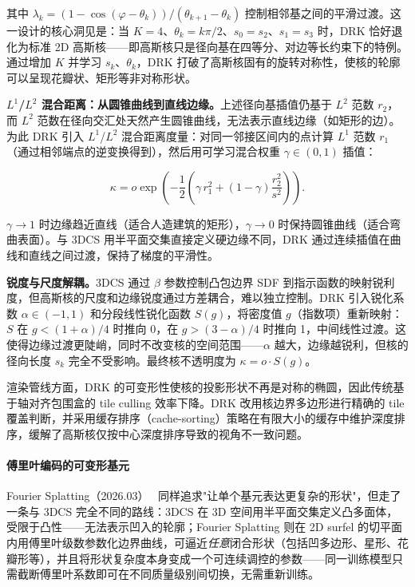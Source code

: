 其中 $\lambda_k = (1 - \cos(\varphi - \theta_k)) / (\theta_{k+1} - \theta_k)$ 控制相邻基之间的平滑过渡。这一设计的核心洞见是：当 $K=4$、$\theta_k = k\pi/2$、$s_0=s_2$、$s_1=s_3$ 时，DRK 恰好退化为标准 2D 高斯核——即高斯核只是径向基在四等分、对边等长约束下的特例。通过增加 $K$ 并学习 $s_k$、$\theta_k$，DRK 打破了高斯核固有的旋转对称性，使核的轮廓可以呈现花瓣状、矩形等非对称形状。

\textbf{$L^1$/$L^2$ 混合距离：从圆锥曲线到直线边缘。}上述径向基插值仍基于 $L^2$ 范数 $r_2$，而 $L^2$ 范数在径向交汇处天然产生圆锥曲线，无法表示直线边缘（如矩形的边）。为此 DRK 引入 $L^1$/$L^2$ 混合距离度量：对同一邻接区间内的点计算 $L^1$ 范数 $r_1$（通过相邻端点的逆变换得到），然后用可学习混合权重 $\gamma \in (0,1)$ 插值：

\begin{equation}
    \kappa = o \exp\!\left(-\frac{1}{2}\left(\gamma \, r_1^2 + (1-\gamma) \frac{r_2^2}{s^2}\right)\right).
\end{equation}

$\gamma \to 1$ 时边缘趋近直线（适合人造建筑的矩形），$\gamma \to 0$ 时保持圆锥曲线（适合弯曲表面）。与 3DCS 用半平面交集直接定义硬边缘不同，DRK 通过连续插值在曲线和直线之间过渡，保持了梯度的平滑性。

\textbf{锐度与尺度解耦。}3DCS 通过 $\beta$ 参数控制凸包边界 SDF 到指示函数的映射锐利度，但高斯核的尺度和边缘锐度通过方差耦合，难以独立控制。DRK 引入锐化系数 $\alpha \in (-1, 1)$ 和分段线性锐化函数 $S(g)$，将密度值 $g$（指数项）重新映射：$S$ 在 $g < (1+\alpha)/4$ 时推向 0，在 $g > (3-\alpha)/4$ 时推向 1，中间线性过渡。这使得边缘过渡更陡峭，同时不改变核的空间范围——$\alpha$ 越大，边缘越锐利，但核的径向长度 $s_k$ 完全不受影响。最终核不透明度为 $\kappa = o \cdot S(g)$。

渲染管线方面，DRK 的可变形性使核的投影形状不再是对称的椭圆，因此传统基于轴对齐包围盒的 tile culling 效率下降。DRK 改用核边界多边形进行精确的 tile 覆盖判断，并采用缓存排序（cache-sorting）策略在有限大小的缓存中维护深度排序，缓解了高斯核仅按中心深度排序导致的视角不一致问题。

\paragraph{傅里叶编码的可变形基元}

Fourier Splatting（2026.03）~\cite{2603_19834} 同样追求"让单个基元表达更复杂的形状"，但走了一条与 3DCS 完全不同的路线：3DCS 在 3D 空间用半平面交集定义凸多面体，受限于凸性——无法表示凹入的轮廓；Fourier Splatting 则在 2D surfel 的切平面内用傅里叶级数参数化边界曲线，可逼近\emph{任意}闭合形状（包括凹多边形、星形、花瓣形等），并且将形状复杂度本身变成一个可连续调控的参数——同一训练模型只需截断傅里叶系数即可在不同质量级别间切换，无需重新训练。

